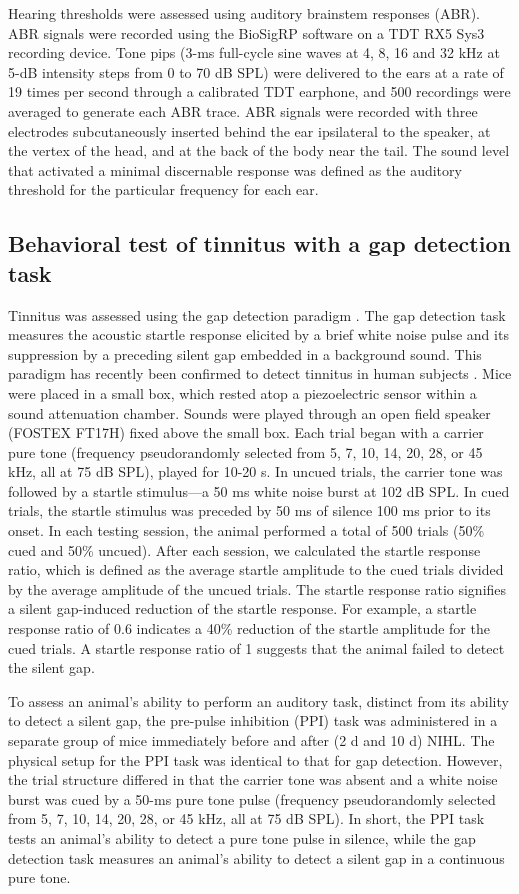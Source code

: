 Hearing thresholds were assessed using auditory brainstem responses (ABR). ABR signals were recorded using the BioSigRP software on a TDT RX5 Sys3 recording device. Tone pips (3-ms full-cycle sine waves at 4, 8, 16 and 32 kHz at 5-dB intensity steps from 0 to 70 dB SPL) were delivered to the ears at a rate of 19 times per second through a calibrated TDT earphone, and 500 recordings were averaged to generate each ABR trace. ABR signals were recorded with three electrodes subcutaneously inserted behind the ear ipsilateral to the speaker, at the vertex of the head, and at the back of the body near the tail. The sound level that activated a minimal discernable response was defined as the auditory threshold for the particular frequency for each ear.

\subsection{Behavioral test of tinnitus with a gap detection task}
Tinnitus was assessed using the gap detection paradigm \cite{Turner2006}. The gap detection task measures the acoustic startle response elicited by a brief white noise pulse and its suppression by a preceding silent gap embedded in a background sound. This paradigm has recently been confirmed to detect tinnitus in human subjects \cite{Fournier2013}. Mice were placed in a small box, which rested atop a piezoelectric sensor within a sound attenuation chamber. Sounds were played through an open field speaker (FOSTEX FT17H) fixed above the small box. Each trial began with a carrier pure tone (frequency pseudorandomly selected from 5, 7, 10, 14, 20, 28, or 45 kHz, all at 75 dB SPL), played for 10-20 s. In uncued trials, the carrier tone was followed by a startle stimulus---a 50 ms white noise burst at 102 dB SPL. In cued trials, the startle stimulus was preceded by 50 ms of silence 100 ms prior to its onset. In each testing session, the animal performed a total of 500 trials (50\% cued and 50\% uncued). After each session, we calculated the startle response ratio, which is defined as the average startle amplitude to the cued trials divided by the average amplitude of the uncued trials. The startle response ratio signifies a silent gap-induced reduction of the startle response. For example, a startle response ratio of 0.6 indicates a 40\% reduction of the startle amplitude for the cued trials. A startle response ratio of 1 suggests that the animal failed to detect the silent gap.

To assess an animal's ability to perform an auditory task, distinct from its ability to detect a silent gap, the pre-pulse inhibition (PPI) task was administered in a separate group of mice immediately before and after (2 d and 10 d) NIHL. The physical setup for the PPI task was identical to that for gap detection. However, the trial structure differed in that the carrier tone was absent and a white noise burst was cued by a 50-ms pure tone pulse (frequency pseudorandomly selected from 5, 7, 10, 14, 20, 28, or 45 kHz, all at 75 dB SPL). In short, the PPI task tests an animal's ability to detect a pure tone pulse in silence, while the gap detection task measures an animal's ability to detect a silent gap in a continuous pure tone.

